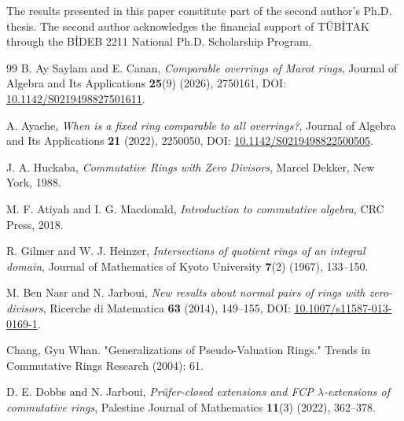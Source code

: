 \documentclass[12pt]{article}
\begin{document}
The results presented in this paper constitute part of
the second author's Ph.D. thesis.
The second author acknowledges the financial support of
T{\"U}B{\.I}TAK through the B{\.I}DEB 2211 National
Ph.D. Scholarship Program.
\begin{thebibliography}{99}
	 B. Ay Saylam and E. Canan, \emph{Comparable overrings of Marot rings}, Journal of Algebra and Its Applications \textbf{25}(9) (2026), 2750161, DOI: \href{https://doi.org/10.1142/S0219498827501611}{10.1142/S0219498827501611}.
	
	
	 A. Ayache, \emph{When is a fixed ring comparable to all overrings?}, Journal of Algebra and Its Applications \textbf{21} (2022), 2250050, DOI: \href{https://doi.org/10.1142/S0219498822500505}{10.1142/S0219498822500505}.
	
	
	 J. A. Huckaba, \emph{Commutative Rings with Zero Divisors}, Marcel Dekker, New York, 1988.
	
	
	 M. F. Atiyah and I. G. Macdonald, \emph{Introduction to commutative algebra}, CRC Press, 2018.
	
	
	 R. Gilmer and W. J. Heinzer, \emph{Intersections of quotient rings of an integral domain}, Journal of Mathematics of Kyoto University \textbf{7}(2) (1967), 133--150.
	
	
	 M. Ben Nasr and N. Jarboui, \emph{New results about normal pairs of rings with zero-divisors}, Ricerche di Matematica \textbf{63} (2014), 149--155, DOI: \href{https://doi.org/10.1007/s11587-013-0169-1}{10.1007/s11587-013-0169-1}.
	
	Chang, Gyu Whan. "Generalizations of Pseudo-Valuation Rings." Trends in Commutative Rings Research (2004): 61.
	
	D. E. Dobbs and N. Jarboui, \emph{Prüfer-closed extensions and FCP $\lambda$-extensions of commutative rings}, Palestine Journal of Mathematics \textbf{11}(3) (2022), 362--378.
	
\end{thebibliography}
\end{document}
